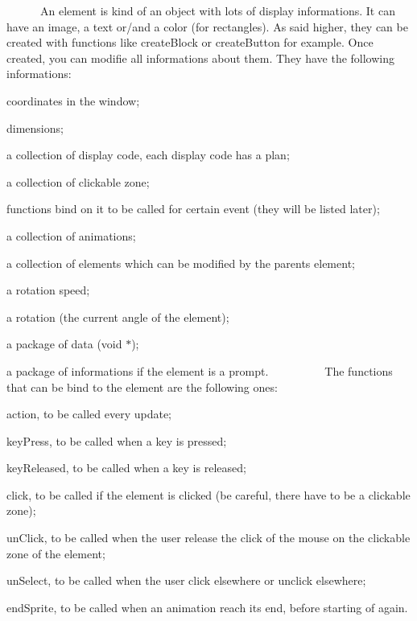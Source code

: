 ~~~~~~An element is kind of an object with lots of display informations. It can have an image, a text or/and a color (for rectangles). As said higher, they can be created with functions like create\+Block or create\+Button for example. Once created, you can modifie all informations about them. They have the following informations\+:
\begin{DoxyItemize}
\item coordinates in the window;
\item dimensions;
\item a collection of display code, each display code has a plan;
\item a collection of clickable zone;
\item functions bind on it to be called for certain event (they will be listed later);
\item a collection of animations;
\item a collection of elements which can be modified by the parent\textquotesingle{}s element;
\item a rotation speed;
\item a rotation (the current angle of the element);
\item a package of data (void $\ast$);
\item a package of informations if the element is a prompt. ~\newline
~\newline
 ~~~~~~The functions that can be bind to the element are the following ones\+:
\item action, to be called every update;
\item key\+Press, to be called when a key is pressed;
\item key\+Released, to be called when a key is released;
\item click, to be called if the element is clicked (be careful, there have to be a clickable zone);
\item un\+Click, to be called when the user release the click of the mouse on the clickable zone of the element;
\item un\+Select, to be called when the user click elsewhere or unclick elsewhere;
\item end\+Sprite, to be called when an animation reach its end, before starting of again. ~\newline
~\newline

\end{DoxyItemize}
